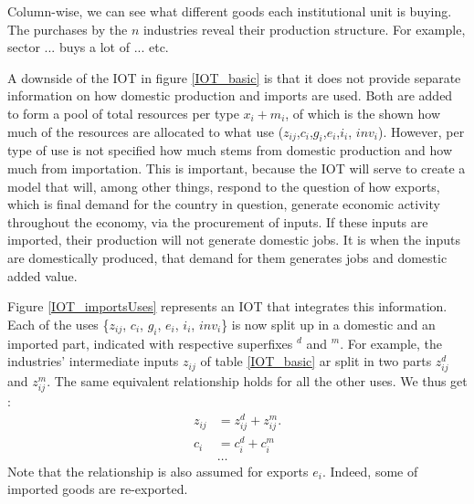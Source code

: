 \documentclass[12pt,english]{article}
\begin{document}
Column-wise, we can see what different goods each institutional unit is buying. The purchases by the $n$ industries reveal their production structure. For example, sector ... buys a lot of ... etc. 

A downside of the IOT in figure \ref{IOT_basic} is that it does not provide separate information on how domestic production and imports are used. Both are added to form a pool of total resources per type $x_i + m_i$, of which is the shown how much of the resources are allocated to what use ($z_{ij}$,$c_i$,$g_i$,$e_i$,$i_i$, $inv_i$). However, per type of use is not specified how much stems from domestic production and how much from importation. This is important, because the IOT will serve to create a model that will, among other things, respond to the question of how exports, which is final demand for the country in question, generate economic activity throughout the economy, via the procurement of inputs. If these inputs are imported, their production will not generate domestic jobs. It is when the inputs are domestically produced, that demand for them generates jobs and domestic added value. 


Figure \ref{IOT_importsUses} represents an IOT that integrates this information. Each of the uses \{$z_{ij}$, $c_i$, $g_i$, $e_i$, $i_i$,  $inv_i$\} is now split up in a domestic and an imported part, indicated with respective superfixes $^d$ and $^m$. For example, the industries' intermediate inputs $z_{ij}$ of table \ref{IOT_basic} ar split in two parts $z_{ij}^d$ and $z_{ij}^m$. The same equivalent relationship holds for all the other uses. We thus get : 
\begin{align}
z_{ij} &= z_{ij}^d + z_{ij}^m. \label{usesDecompMX} \\
c_i &= c_i^d + c_i^m \nonumber \\
&\ldots \nonumber
\end{align}  Note that the relationship is also assumed for exports $e_i$. Indeed, some of imported goods are re-exported. 	
\end{document}
